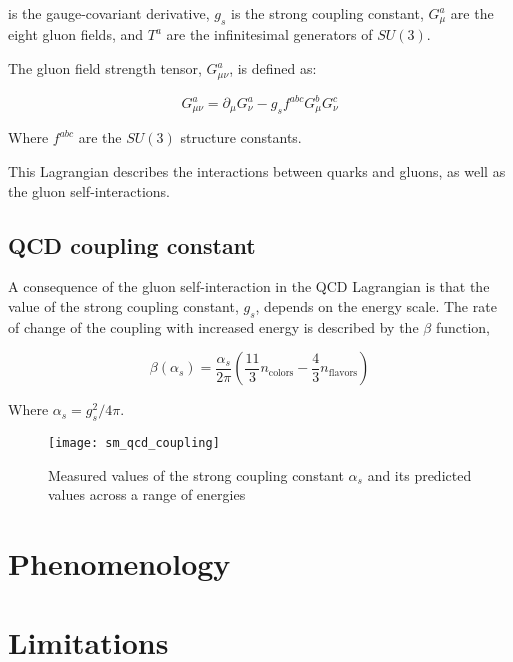 is the gauge-covariant derivative, $g_s$ is the strong coupling constant, $G_\mu^a$ are the eight gluon fields,
and $T^a$ are the infinitesimal generators of $SU(3)$.

The gluon field strength tensor, $G_{\mu\nu}^a$, is defined as:

\begin{equation}\label{eq:qcd_field_strength}
    G_{\mu\nu}^a = \partial_\mu G_\nu^a - g_s f^{abc} G_\mu^b G_\nu ^c
\end{equation}

Where $f^{abc}$ are the $SU(3)$ structure constants.

This Lagrangian describes the interactions between quarks and gluons, as well as the gluon self-interactions.

\subsection{QCD coupling constant}\label{subsec:qcd_coupling}

A consequence of the gluon self-interaction in the QCD Lagrangian is that the value of the strong coupling constant,
$g_s$, depends on the energy scale.
The rate of change of the coupling with increased energy is described by the $\beta$ function,

\begin{equation}\label{eq:sm_qcd_beta}
    \beta\left(\alpha_s\right) = \frac{\alpha_s}{2\pi}\left(\frac{11}{3}n_{\text{colors}}-\frac{4}{3}n_{\text{flavors}}\right)
\end{equation}

Where $\alpha_s = g_s^2 / 4\pi$.


\begin{figure}[h!]
    \centering
\texttt{[image: sm\_qcd\_coupling]}
\caption{Measured values of the strong coupling constant $\alpha_s$ and its predicted values across a range of energies}
\label{fig:sm_qcd_coupling}
\end{figure}

\section{Phenomenology}\label{sec:sm_pheno}

\section{Limitations}\label{sec:sm_limits}
